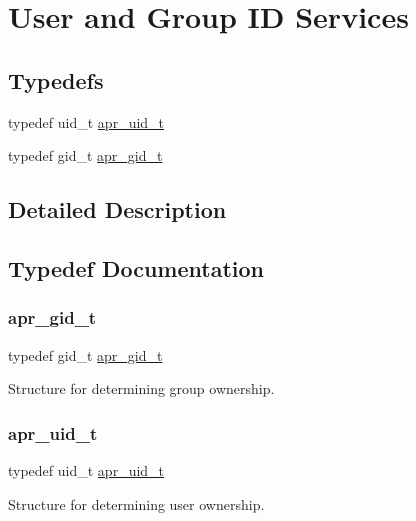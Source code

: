 \hypertarget{group__apr__user}{}\section{User and Group ID Services}
\label{group__apr__user}
\subsection*{Typedefs}
\begin{DoxyCompactItemize}
\item 
typedef uid\+\_\+t \mbox{\hyperlink{group__apr__user_gad1aa508f584bc230acf4f68ba4fc4de7}{apr\+\_\+uid\+\_\+t}}
\item 
typedef gid\+\_\+t \mbox{\hyperlink{group__apr__user_ga22e9e224e984f837f3e276833e2f3a55}{apr\+\_\+gid\+\_\+t}}
\end{DoxyCompactItemize}


\subsection{Detailed Description}


\subsection{Typedef Documentation}
\mbox{\label{group__apr__user_ga22e9e224e984f837f3e276833e2f3a55}} 
\subsubsection{\texorpdfstring{apr\+\_\+gid\+\_\+t}{apr\_gid\_t}}
{\footnotesize\ttfamily typedef gid\+\_\+t \mbox{\hyperlink{group__apr__user_ga22e9e224e984f837f3e276833e2f3a55}{apr\+\_\+gid\+\_\+t}}}

Structure for determining group ownership. \mbox{\label{group__apr__user_gad1aa508f584bc230acf4f68ba4fc4de7}} 
\subsubsection{\texorpdfstring{apr\+\_\+uid\+\_\+t}{apr\_uid\_t}}
{\footnotesize\ttfamily typedef uid\+\_\+t \mbox{\hyperlink{group__apr__user_gad1aa508f584bc230acf4f68ba4fc4de7}{apr\+\_\+uid\+\_\+t}}}

Structure for determining user ownership. 